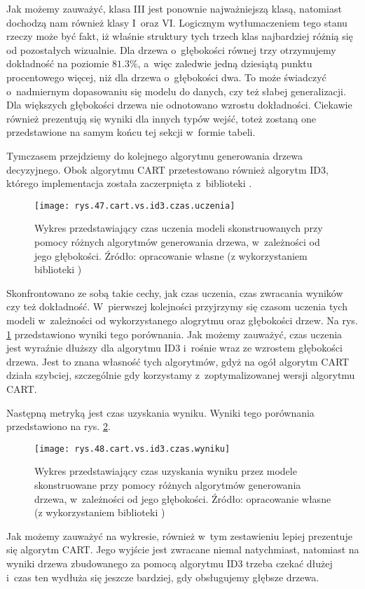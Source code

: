 Jak możemy zauważyć, klasa III jest ponownie najważniejszą klasą, natomiast dochodzą nam również klasy I~oraz VI. Logicznym wytłumaczeniem tego stanu rzeczy może być fakt, iż właśnie struktury tych trzech klas najbardziej różnią się od pozostałych wizualnie. Dla drzewa o~głębokości równej trzy otrzymujemy dokładność na poziomie $81.3\%$, a~więc zaledwie jedną dziesiątą punktu procentowego więcej, niż dla drzewa o~głębokości dwa. To może świadczyć o~nadmiernym dopasowaniu się modelu do danych, czy też słabej generalizacji. Dla większych głębokości drzewa nie odnotowano wzrostu dokładności. Ciekawie również prezentują się wyniki dla innych typów wejść, toteż zostaną one przedstawione na samym końcu tej sekcji w~formie tabeli. 

Tymczasem przejdziemy do kolejnego algorytmu generowania drzewa decyzyjnego. Obok algorytmu CART przetestowano również algorytm ID3, którego implementacja została zaczerpnięta z~biblioteki . 
\begin{figure}[h]
    \centering
    \texttt{[image: rys.47.cart.vs.id3.czas.uczenia]}
    \caption{Wykres przedstawiający czas uczenia modeli skonstruowanych przy pomocy różnych algorytmów generowania drzewa, w~zależności od jego głębokości. Źródło: opracowanie własne (z wykorzystaniem biblioteki )}
    \label{rys.47.cart.vs.id3.czas.uczenia}
\end{figure}
Skonfrontowano ze sobą takie cechy, jak czas uczenia, czas zwracania wyników czy też dokładność. W~pierwszej kolejności przyjrzymy się czasom uczenia tych modeli w~zależności od wykorzystanego alogrytmu oraz głębokości drzew. Na rys. \ref{rys.47.cart.vs.id3.czas.uczenia} przedstawiono wyniki tego porównania.
Jak możemy zauważyć, czas uczenia jest wyraźnie dłuższy dla algorytmu ID3 i~rośnie wraz ze wzrostem głębokości drzewa. Jest to znana własność tych algorytmów, gdyż na ogół algorytm CART działa szybciej, szczególnie gdy korzystamy z~zoptymalizowanej wersji algorytmu CART. 

Następną metryką jest czas uzyskania wyniku. Wyniki tego porównania przedstawiono na rys. \ref{rys.48.cart.vs.id3.czas.wyniku}. 
\begin{figure}[h]
    \centering
    \texttt{[image: rys.48.cart.vs.id3.czas.wyniku]}
    \caption{Wykres przedstawiający czas uzyskania wyniku przez modele skonstruowane przy pomocy różnych algorytmów generowania drzewa, w~zależności od jego głębokości. Źródło: opracowanie własne (z wykorzystaniem biblioteki )}
    \label{rys.48.cart.vs.id3.czas.wyniku}
\end{figure}
Jak możemy zauważyć na wykresie, również w~tym zestawieniu lepiej prezentuje się algorytm CART. Jego wyjście jest zwracane niemal natychmiast, natomiast na wyniki drzewa zbudowanego za pomocą algorytmu ID3 trzeba czekać dłużej i~czas ten wydłuża się jeszcze bardziej, gdy obsługujemy głębsze drzewa. 

